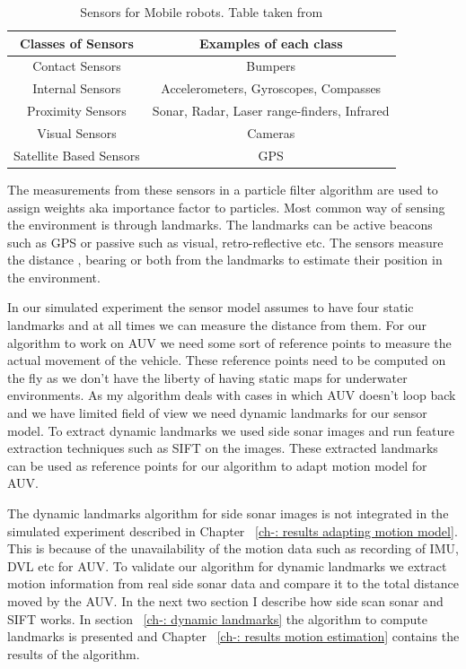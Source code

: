 \documentclass[12pt]{dalcsthesis}
\begin{document}
\begin {table}[tbh]
\begin{tabular}{|c|c|}
\hline 
Classes of Sensors & Examples of each class \\ 
\hline 
Contact Sensors & Bumpers \\ 
\hline 
Internal Sensors & Accelerometers, Gyroscopes, Compasses \\ 
\hline 
Proximity Sensors & Sonar, Radar, Laser range-finders, Infrared \\ 
\hline 
Visual Sensors  & Cameras \\ 
\hline 
Satellite Based Sensors & GPS \\ 
\hline 
\end{tabular}
\caption{\label{tab-: classes of sensors} Sensors for Mobile robots. Table taken from \cite{thrun2005probabilistic}}
\end{table}
The measurements from these sensors in a particle filter algorithm are used to assign weights aka importance factor to particles. Most common way of sensing the environment is through landmarks. The landmarks can be active beacons such as GPS or passive such as visual, retro-reflective etc. The sensors measure the distance , bearing or both from the landmarks to estimate their position in the environment. 

In our simulated experiment the sensor model assumes to have four static landmarks and at all times we can measure the distance from them. For our algorithm to work on AUV we need some sort of reference points to measure the actual movement of the vehicle. These reference points need to be computed on the fly as we don't have the liberty of having static maps for underwater environments. As my algorithm deals with cases in which AUV doesn't loop back and we have limited field of view we need dynamic landmarks for our sensor model. To extract dynamic landmarks we used side sonar images and run feature extraction techniques such as SIFT on the images. These extracted landmarks can be used as reference points for our algorithm to adapt motion model for AUV.

The dynamic landmarks algorithm for side sonar images is not integrated in the simulated experiment described in Chapter ~\ref{ch-: results adapting motion model}. This is because of the unavailability of the motion data such as recording of IMU, DVL etc for AUV. To validate our algorithm for dynamic landmarks we extract motion information from real side sonar data and compare it to the total distance moved by the AUV. In the next two section I describe how side scan sonar and SIFT works. In section ~\ref{ch-: dynamic landmarks} the algorithm to compute landmarks is presented and Chapter ~\ref{ch-: results motion estimation} contains the results of the algorithm.  
\end{document}
